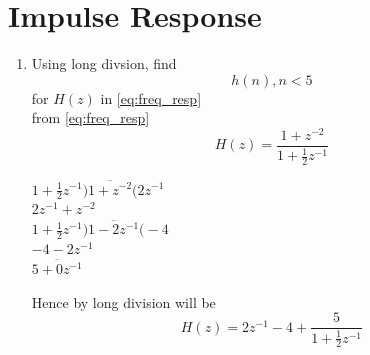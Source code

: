 \documentclass[journal,12pt,twocolumn]{IEEEtran}
\renewcommand\thesection{\arabic{section}}
\begin{document}
\section{Impulse Response}
\begin{enumerate}[label=\thesection.\arabic*]
\item Using long divsion, find
\begin{equation}
    h(n) , n<5
\end{equation}
for $H(z)$ in \eqref{eq:freq_resp} \\
\solution from \eqref{eq:freq_resp}
\begin{equation}
    H(z) = \frac{1 + z^{-2}}{1 + \frac{1}{2}z^{-1}}
\end{equation}
\begin{center}
    $1 + \frac{1}{2}z^{-1}\overline{)1 + z^{-2}(} 2z^{-1}$\\
    ${2z^{-1} + z^{-2}}$\\
    $1 + \frac{1}{2}z^{-1}\overline{)1-2z^{-1}(} -4$\\
    $-4 - 2z^{-1}$\\
    $\overline{5 + 0z^{-1}}$
\end{center}
Hence by long division will be 
\begin{equation}
    H(z) = 2z^{-1} -4 + \frac{5}{1 + \frac{1}{2}z^{-1}}
\end{equation}


\end{enumerate}
\end{document}
